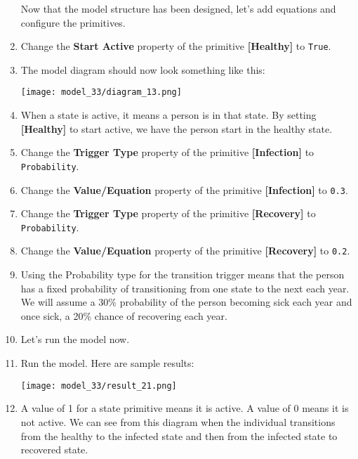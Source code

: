 \documentclass[]{memoir}
\makeatletter
\def\maxwidth{\ifdim\Gin@nat@width>\linewidth\linewidth
\else\Gin@nat@width\fi}
\let\Oldincludegraphics\includegraphics
\renewcommand{\includegraphics}[1]{\Oldincludegraphics[width=\maxwidth]{#1}}
\newcommand{\p}[1]{\textbf{{[}#1{]}}}
\newcommand{\e}[1]{\texttt{#1}}
\renewcommand{\a}[1]{\textbf{#1}}
\makeatother
\begin{document}
\begin{oframed}
\begin{enumerate}
Now that the model structure has been designed, let's add equations and configure the primitives.


\item  Change the \a{Start Active} property of the primitive \p{Healthy} to \e{True}.
\item The model diagram should now look something like this: \par \begin{minipage}{\linewidth}  \centering \texttt{[image: model\_33/diagram\_13.png]}
\end{minipage}
\item 

When a state is active, it means a person is in that state. By setting \p{Healthy} to start active, we have the person start in the healthy state.


\item  Change the \a{Trigger Type} property of the primitive \p{Infection} to \e{Probability}.
\item  Change the \a{Value/Equation} property of the primitive \p{Infection} to \e{0.3}.
\item  Change the \a{Trigger Type} property of the primitive \p{Recovery} to \e{Probability}.
\item  Change the \a{Value/Equation} property of the primitive \p{Recovery} to \e{0.2}.
\item 

Using the Probability type for the transition trigger means that the person has a fixed probability of transitioning from one state to the next each year. We will assume a 30\% probability of the person becoming sick each year and once sick, a 20\% chance of recovering each year.


\item 

Let's run the model now.


\item Run the model. Here are sample results:\par \begin{minipage}{\linewidth}  \centering \texttt{[image: model\_33/result\_21.png]}
\end{minipage}
\item 

A value of 1 for a state primitive means it is active. A value of 0 means it is not active. We can see from this diagram when the individual transitions from the healthy to the infected state and then from the infected state to recovered state.



\end{enumerate}
\end{oframed}
\end{document}

